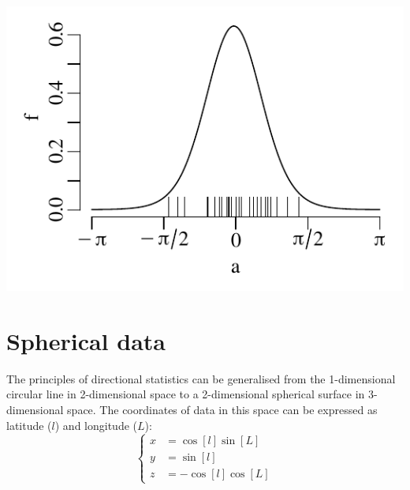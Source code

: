 \noindent\begin{minipage}[t][][b]{.4\textwidth}
\includegraphics[width=\textwidth]{../figures/kappastriations.pdf}\medskip
\end{minipage}
\begin{minipage}[t][][t]{.6\textwidth}
  \label{fig:kappastriations}
\end{minipage}

\section{Spherical data}
\label{sec:spherical-data}

The principles of directional statistics can be generalised from the
1-dimensional circular line in 2-dimensional space to a 2-dimensional
spherical surface in 3-dimensional space. The coordinates of data in
this space can be expressed as latitude ($l$) and longitude ($L$):
\begin{equation}
  \left\{
  \begin{split}
    x & = \cos[l]\sin[L]\\
    y & = \sin[l]\\
    z & = -\cos[l]\cos[L]
  \end{split}
  \right.
  \label{eq:lL}
\end{equation}

